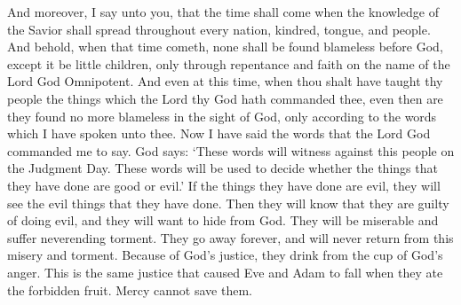 And moreover, I say unto you, that the time shall come when the knowledge of the Savior shall spread throughout every nation, kindred, tongue, and people.
\bverse \iffalse And behold, when that time cometh, none shall be found blameless before God, except it be little children, only through repentance and faith on the name of the Lord God Omnipotent. \fi
And behold, when that time cometh, none shall be found blameless before God, except it be little children, only through repentance and faith on the name of the Lord God Omnipotent.
\bverse \iffalse And even at this time, when thou shalt have taught thy people the things which the Lord thy God hath commanded thee, even then are they found no more blameless in the sight of God, only according to the words which I have spoken unto thee. \fi
And even at this time, when thou shalt have taught thy people the things which the Lord thy God hath commanded thee, even then are they found no more blameless in the sight of God, only according to the words which I have spoken unto thee.
\bverse \iffalse And now I have spoken the words which the Lord God hath commanded me. \fi
Now I have said the words that the Lord God commanded me to say.
\bverse \iffalse And thus saith the Lord: They shall stand as a bright testimony against this people, at the judgment day; whereof they shall be judged, every man according to his works, whether they be good, or whether they be evil. \fi
God says: \lq These words will witness against this people on the Judgment Day. These words will be used to decide whether the things that they have done are good or evil.\rq
\bverse \iffalse And if they be evil they are consigned to an awful view of their own guilt and abominations, which doth cause them to shrink from the presence of the Lord into a state of misery and endless torment, from whence they can no more return; therefore they have drunk damnation to their own souls. \fi
If the things they have done are evil, they will see the evil things that they have done. Then they will know that they are guilty of doing evil, and they will want to hide from God. They will be miserable and suffer neverending torment. They go away forever, and will never return from this misery and torment. 
\bverse \iffalse Therefore, they have drunk out of the cup of the wrath of God, which justice could no more deny unto them than it could deny that Adam should fall because of his partaking of the forbidden fruit; therefore, mercy could have claim on them no more forever. \fi
Because of God's justice, they drink from the cup of God's anger. This is the same justice that caused Eve and Adam to fall when they ate the forbidden fruit. Mercy cannot save them.
